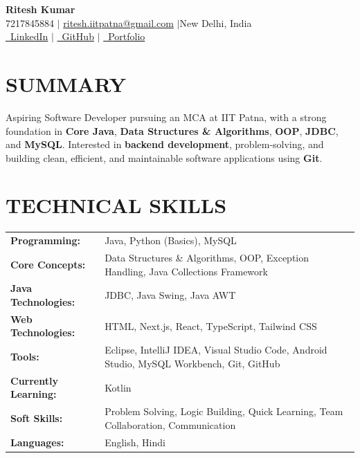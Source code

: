 \documentclass[10pt,letterpaper]{article}
\newcommand{\linkedinurl}{https://www.linkedin.com/in/ritesh-iitpatna/}
\newcommand{\githuburl}{https://github.com/ritesh-iitpatna}
\newcommand{\portfoliourl}{https://portfolio-one-phi-bh3n1xdisv.vercel.app/} %
\begin{document}
\begin{center}
  {\LARGE\bfseries Ritesh Kumar}\\[4pt]
  \small
  7217845884 \quad$|$\quad
  \href{mailto:ritesh.iitpatna@gmail.com}{ritesh.iitpatna@gmail.com}
  \quad$|$\quad New Delhi, India\\[3pt]
  \href{\linkedinurl}{\faLinkedin\ LinkedIn} \quad$|$\quad
  \href{\githuburl}{\faGithub\ GitHub} \quad$|$\quad
  \href{\portfoliourl}{\faGlobe\ Portfolio}
\end{center}

\section*{SUMMARY}
Aspiring Software Developer pursuing an MCA at IIT Patna, with a strong
foundation in \textbf{Core Java}, \textbf{Data Structures \& Algorithms}, \textbf{OOP}, \textbf{JDBC}, and \textbf{MySQL}.
Interested in \textbf{backend development}, problem-solving, and building clean,
efficient, and maintainable software applications using \textbf{Git}.

\section*{TECHNICAL SKILLS}
\begin{tabularx}{\linewidth}{@{}l@{\hspace{6pt}}X@{}}
\textbf{Programming:} & Java, Python (Basics), MySQL \\[1.5pt]
\textbf{Core Concepts:} & Data Structures \& Algorithms, OOP, Exception Handling, Java Collections Framework \\[1.5pt]
\textbf{Java Technologies:} & JDBC, Java Swing, Java AWT \\[1.5pt]
\textbf{Web Technologies:} & HTML, Next.js, React, TypeScript, Tailwind CSS \\[1.5pt]
\textbf{Tools:} & Eclipse, IntelliJ IDEA, Visual Studio Code, Android Studio, MySQL Workbench, Git, GitHub \\[1.5pt]
\textbf{Currently Learning:} & Kotlin \\[1.5pt]
\textbf{Soft Skills:} & Problem Solving, Logic Building, Quick Learning, Team Collaboration, Communication \\[1.5pt]
\textbf{Languages:} & English, Hindi
\end{tabularx}

\end{document}
